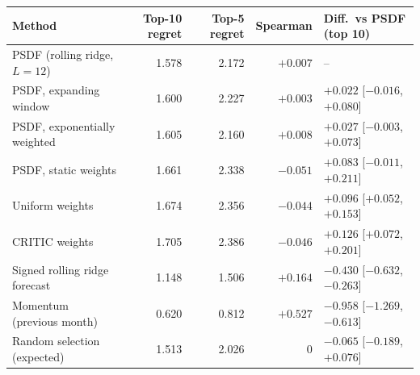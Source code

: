 \begin{tabular}{lrrrl}
\toprule
Method & Top-10 regret & Top-5 regret & Spearman & Diff.\ vs PSDF (top 10) \\
\midrule
PSDF (rolling ridge, $L=12$) & 1.578 & 2.172 & $+0.007$ & -- \\
PSDF, expanding window & 1.600 & 2.227 & $+0.003$ & $+0.022$ [$-0.016$, $+0.080$] \\
PSDF, exponentially weighted & 1.605 & 2.160 & $+0.008$ & $+0.027$ [$-0.003$, $+0.073$] \\
PSDF, static weights & 1.661 & 2.338 & $-0.051$ & $+0.083$ [$-0.011$, $+0.211$] \\
Uniform weights & 1.674 & 2.356 & $-0.044$ & $+0.096$ [$+0.052$, $+0.153$] \\
CRITIC weights & 1.705 & 2.386 & $-0.046$ & $+0.126$ [$+0.072$, $+0.201$] \\
Signed rolling ridge forecast & 1.148 & 1.506 & $+0.164$ & $-0.430$ [$-0.632$, $-0.263$] \\
Momentum (previous month) & 0.620 & 0.812 & $+0.527$ & $-0.958$ [$-1.269$, $-0.613$] \\
Random selection (expected) & 1.513 & 2.026 & 0 & $-0.065$ [$-0.189$, $+0.076$] \\
\bottomrule
\end{tabular}
